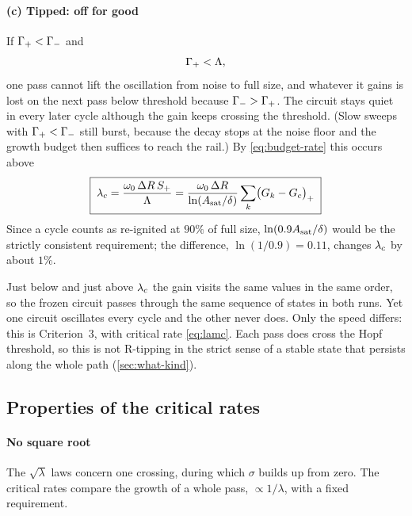 \paragraph{(c) Tipped: off for good} If $\Gamma_{+}<\Gamma_{-}$ and
\begin{equation}
  \Gamma_{+} < \Lambda ,
  \label{eq:tip-condition}
\end{equation}
one pass cannot lift the oscillation from noise to full size, and whatever it gains is lost on the next
pass below threshold because $\Gamma_{-}>\Gamma_{+}$. The circuit stays quiet in every later cycle although the gain
keeps crossing the threshold. (Slow sweeps with $\Gamma_{+}<\Gamma_{-}$ still burst, because the decay stops at the
noise floor and the growth budget then suffices to reach the rail.) By \cref{eq:budget-rate} this occurs
above
\begin{equation}
  \boxed{\;\lambda_{c} = \frac{\omega_{0}\,\Delta R\,S_{+}}{\Lambda}
  = \frac{\omega_{0}\,\Delta R}{\ln(A_{\mathrm{sat}}/\delta)}\sum_{k}\bigl(G_{k}-G_{c}\bigr)_{+}\;}
  \label{eq:lamc}
\end{equation}
Since a cycle counts as re-ignited at $90\%$ of full size, $\ln(0.9A_{\mathrm{sat}}/\delta)$ would be the strictly
consistent requirement; the difference, $\ln(1/0.9)=0.11$, changes $\lambda_{c}$ by about $1\%$.

\begin{whybox}
Just below and just above $\lambda_{c}$ the gain visits the same values in the same order, so the frozen
circuit passes through the same sequence of states in both runs. Yet one circuit oscillates every cycle
and the other never does. Only the speed differs: this is Criterion~3, with critical rate \cref{eq:lamc}.
Each pass does cross the Hopf threshold, so this is not R-tipping in the strict sense of a stable state
that persists along the whole path (\cref{sec:what-kind}).
\end{whybox}

\subsection{Properties of the critical rates}

\paragraph{No square root} The $\sqrt{\lambda}$ laws concern one crossing, during which $\sigma$ builds up
from zero. The critical rates compare the growth of a whole pass, $\propto 1/\lambda$, with a fixed
requirement.

